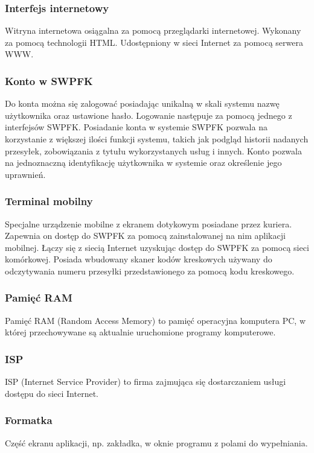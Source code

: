 \subsubsection*{Interfejs internetowy}
Witryna internetowa osiągalna za pomocą przeglądarki internetowej. Wykonany za pomocą technologii HTML. Udostępniony w sieci Internet za pomocą serwera WWW.

\subsubsection*{Konto w SWPFK}
Do konta można się zalogować posiadając unikalną w skali systemu nazwę użytkownika oraz ustawione hasło. Logowanie następuje za pomocą jednego z interfejsów SWPFK. Posiadanie konta w systemie SWPFK pozwala na korzystanie z większej ilości funkcji systemu, takich jak podgląd historii nadanych przesyłek, zobowiązania z tytułu wykorzystanych usług i innych. Konto pozwala na jednoznaczną identyfikację użytkownika w systemie oraz określenie jego uprawnień.

\subsubsection*{Terminal mobilny}
Specjalne urządzenie mobilne z ekranem dotykowym posiadane przez kuriera. Zapewnia on dostęp do SWPFK za pomocą zainstalowanej na nim aplikacji mobilnej. Łączy się z siecią Internet uzyskując dostęp do SWPFK za pomocą sieci komórkowej. Posiada wbudowany skaner kodów kreskowych używany do odczytywania numeru przesyłki przedstawionego za pomocą kodu kreskowego.

\subsubsection*{Pamięć RAM}
Pamięć RAM (Random Access Memory) to pamięć operacyjna komputera PC, w której przechowywane są aktualnie uruchomione programy komputerowe.

\subsubsection*{ISP}
ISP (Internet Service Provider) to firma zajmująca się dostarczaniem usługi dostępu do sieci Internet.

\subsubsection*{Formatka}
Część ekranu aplikacji, np. zakładka, w oknie programu z polami do wypełniania.